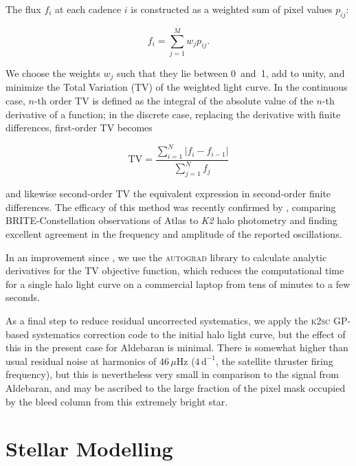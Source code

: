 \documentclass[modern]{aastex61}
\newcommand{\ktwo}{\emph{K2}\xspace}
\begin{document}
The flux $f_i$ at each cadence $i$ is constructed as a weighted sum of pixel values $p_{ij}$:

\begin{equation}
	f_i = \sum_{j=1}^{M} w_j p_{ij}.
\end{equation}

\noindent We choose the weights $w_j$ such that they lie between 0~and~1, add to unity, and minimize the Total Variation (TV) of the weighted light curve. In the continuous case, $n$-th order TV is defined as the integral of the absolute value of the $n$-th derivative of a function; in the discrete case, replacing the derivative with finite differences, first-order TV becomes

\begin{equation}
\text{TV} = \dfrac{\sum_{i=1}^{N} |{f}_i - {f}_{i-1}|}{\sum_{j=1}^{N} {f}_j}
\end{equation}

\noindent and likewise second-order TV the equivalent expression in second-order finite differences. The efficacy of this method was recently confirmed by \citet{kallinger2017}, comparing BRITE-Constellation observations of Atlas to \ktwo halo photometry and finding excellent agreement in the frequency and amplitude of the reported oscillations.

In an improvement since \citet{White2017}, we use the \textsc{autograd} library \citep{maclaurinautograd} to calculate analytic derivatives for the TV objective function, which reduces the computational time for a single halo light curve on a commercial laptop from tens of minutes to a few seconds.

As a final step to reduce residual uncorrected systematics, we apply the \textsc{k2sc} \citep{k2sc} GP-based systematics correction code to the initial halo light curve, but the effect of this in the present case for Aldebaran is minimal.
There is somewhat higher than usual residual noise at harmonics of $46\,\mu\mathrm{Hz}$ ($4\,\mathrm{d}^{-1}$, the satellite thruster firing frequency), but this is nevertheless very small in comparison to the signal from Aldebaran, and may be ascribed to the large fraction of the pixel mask occupied by the bleed column from this extremely bright star.

\section{Stellar Modelling}\label{sec:mod}
\end{document}
